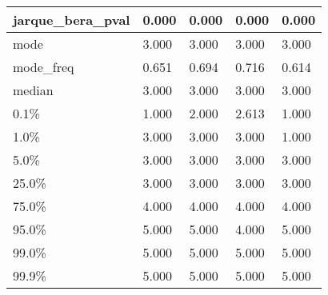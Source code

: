 \begin{table}[H]
\begin{tabular}{|l|m{10em}|m{10em}|m{10em}|m{10em}|}
\hline jarque\_bera\_pval & 0.000 & 0.000 & 0.000 & 0.000 \\
\hline mode & 3.000 & 3.000 & 3.000 & 3.000 \\
\hline mode\_freq & 0.651 & 0.694 & 0.716 & 0.614 \\
\hline median & 3.000 & 3.000 & 3.000 & 3.000 \\
\hline 0.1\% & 1.000 & 2.000 & 2.613 & 1.000 \\
\hline 1.0\% & 3.000 & 3.000 & 3.000 & 1.000 \\
\hline 5.0\% & 3.000 & 3.000 & 3.000 & 3.000 \\
\hline 25.0\% & 3.000 & 3.000 & 3.000 & 3.000 \\
\hline 75.0\% & 4.000 & 4.000 & 4.000 & 4.000 \\
\hline 95.0\% & 5.000 & 5.000 & 4.000 & 5.000 \\
\hline 99.0\% & 5.000 & 5.000 & 5.000 & 5.000 \\
\hline 99.9\% & 5.000 & 5.000 & 5.000 & 5.000 \\
\hline
\end{tabular}
\end{table}
